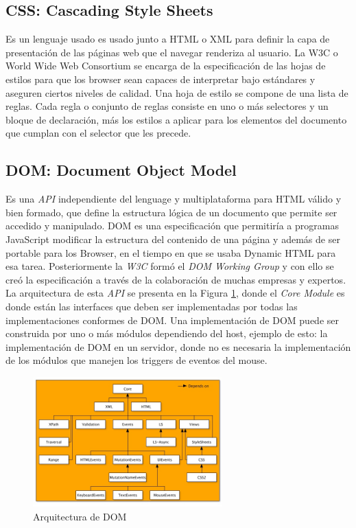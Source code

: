     \subsection{CSS: Cascading Style Sheets}
    \label{chap2:css}
    Es un lenguaje usado es usado junto a HTML o XML para definir la capa de presentación de las páginas web que el navegar renderiza al usuario. La W3C o World Wide Web Consortium se encarga de la especificación de las hojas de estilos para que los browser sean capaces de interpretar bajo estándares y aseguren ciertos niveles de calidad. Una hoja de estilo se compone de una lista de reglas. Cada regla o conjunto de reglas consiste en uno o más selectores y un bloque de declaración, más los estilos a aplicar para los elementos del documento que cumplan con el selector que les precede. 


    \subsection{DOM: Document Object Model}
    \label{chap2:DOM}
    Es una \textit{API} independiente del lenguage y multiplataforma para HTML válido y bien formado, que define la estructura lógica de un documento que permite ser accedido y manipulado. DOM es una especificación que permitiría a programas JavaScript modificar la estructura del contenido de una página y además de ser portable para los Browser, en el tiempo en que se usaba Dynamic HTML para esa tarea. Posteriormente la \textit{W3C} \cite{w3c} formó el \textit{DOM Working Group} y con ello se creó la especificación a través de la colaboración de muchas empresas y expertos. La arquitectura de esta \textit{API} se presenta en la Figura \ref{fig:DOM}, donde el \textit{Core Module} es donde están las interfaces que deben ser implementadas por todas las implementaciones conformes de DOM. Una implementación de DOM puede ser construida por uno o más módulos dependiendo del host, ejemplo de esto: la implementación de DOM en un servidor, donde no es necesaria la implementación de los módulos que manejen los triggers de eventos del mouse.
            
    \begin{figure}[h]
        \centering
        \includegraphics[width=0.65\textwidth]{figures/dom-architecture.jpg}
        \caption{Arquitectura de DOM \cite{w3c}}
        \label{fig:DOM}
    \end{figure}
            
